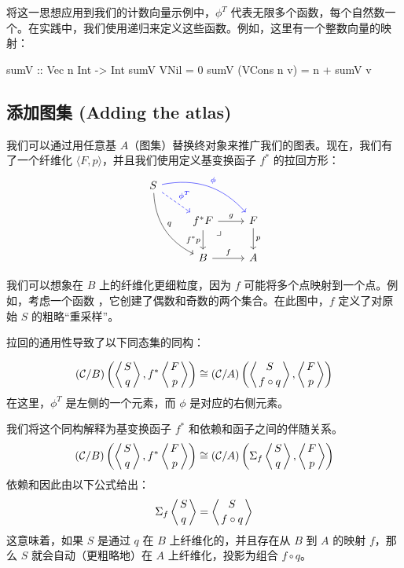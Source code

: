 \documentclass[DaoFP]{subfiles}
\begin{document}
  将这一思想应用到我们的计数向量示例中，$\phi^T$ 代表无限多个函数，每个自然数一个。在实践中，我们使用递归来定义这些函数。例如，这里有一个整数向量的映射：
  \begin{haskell}
   sumV :: Vec n Int -> Int
   sumV VNil = 0
   sumV (VCons n v) = n + sumV v
  \end{haskell}

  \subsection{添加图集 (Adding the atlas)}

  我们可以通过用任意基 $A$（图集）替换终对象来推广我们的图表。现在，我们有了一个纤维化 $\langle F, p \rangle$，并且我们使用定义基变换函子 $f^*$ 的拉回方形：
  \[
   \begin{tikzcd}
    S
    \arrow[dr, blue, dashed, "\phi^T"]
    \arrow[drr, blue, bend left, "\phi"]
    \arrow[ddr, bend right, "q"]
    \\
    &f^* F
    \arrow[dr, phantom,  , very near start, "\lrcorner"]
    \arrow[r, "g"]
    \arrow[d, "f^* p"']
    &F
    \arrow[d, "p"]
    \\
    &B
    \arrow[r, "f"]
    &A
   \end{tikzcd}
  \]

  我们可以想象在 $B$ 上的纤维化更细粒度，因为 $f$ 可能将多个点映射到一个点。例如，考虑一个函数 ，它创建了偶数和奇数的两个集合。在此图中，$f$ 定义了对原始 $S$ 的粗略“重采样”。

  拉回的通用性导致了以下同态集的同构：

  \[  (\mathcal{C}/B) \left( \left \langle {S \atop q} \right \rangle , f^* \left \langle {F \atop p} \right \rangle \right) \cong (\mathcal{C}/A) \left( \left \langle {S \atop f \circ q } \right \rangle , \left \langle {F \atop p} \right \rangle \right)  \]
  在这里，$\phi^T$ 是左侧的一个元素，而 $\phi$ 是对应的右侧元素。

  我们将这个同构解释为基变换函子 $f^*$ 和依赖和函子之间的伴随关系。
  \[  (\mathcal{C}/B) \left( \left \langle {S \atop q} \right \rangle , f^* \left \langle {F \atop p} \right \rangle \right) \cong (\mathcal{C}/A) \left( \Sigma_f \left \langle {S \atop q} \right \rangle , \left \langle {F \atop p} \right \rangle \right)  \]
  依赖和因此由以下公式给出：
  \[ \Sigma_f \left \langle {S \atop q} \right \rangle =  \left \langle {S \atop f \circ q} \right \rangle \]
  这意味着，如果 $S$ 是通过 $q$ 在 $B$ 上纤维化的，并且存在从 $B$ 到 $A$ 的映射 $f$，那么 $S$ 就会自动（更粗略地）在 $A$ 上纤维化，投影为组合 $f \circ q$。
\end{document}
